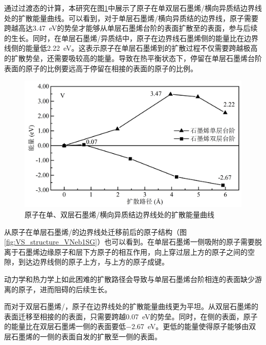     通过过渡态的计算，本研究在图\ref{fig:VS_DFT_NEB_V_GtVSe}中展示了原子在单双层石墨烯/横向异质结边界线处的扩散能量曲线。可以看到，对于单层石墨烯/横向异质结的边界线，原子需要跨越高达\SI{3.47}{\electronvolt}的势垒才能够从单层石墨烯台阶的表面扩散至的表面，参与后续的生长。同时，在单层石墨烯/异质结中，原子在边界线石墨烯侧的能量比在边界线侧的能量低\SI{2.22}{\electronvolt}。这表示原子在单层石墨烯到的扩散过程不仅需要跨越极高的扩散势垒，还需要吸较高的能量。导致在热平衡状态下，停留在单层石墨烯台阶表面的原子的比例要远高于停留在相接的表面的原子的比例。

    \begin{figure}[htb]
        \includegraphics{pic/VS_DFT_NEB_V_GtVSe.png}
        \captionsetup{width=\textwidth}
        \caption{原子在单、双层石墨烯/横向异质结边界线处的扩散能量曲线}
        \label{fig:VS_DFT_NEB_V_GtVSe}
    \end{figure}
    

    从原子在单层石墨烯/的边界线处迁移前后的原子结构（图\ref{fig:VS_structure_VNeb1SG}）也可以看到。在单层石墨烯一侧吸附的原子需要脱离于石墨烯边缘原子和层下方原子的相互作用，向上穿过层上方的原子之间的空隙，到达边界线侧的原子上方，与上方的原子成键。

    动力学和热力学上如此困难的扩散路径会导致与单层石墨烯台阶相连的表面缺少游离的原子，进而阻碍的后续生长。

    而对于双层石墨烯/，原子在边界线处的扩散能量曲线更为平坦。从双层石墨烯的表面迁移至相接的的表面，只需要跨越\SI{0.07}{\electronvolt}的势垒。同时，在侧的表面，原子的能量比在双层石墨烯一侧的表面要低\SI{-2.67}{\electronvolt}。更低的能量使得原子能够由双层石墨烯的一侧的表面自发的扩散至一侧的表面。


